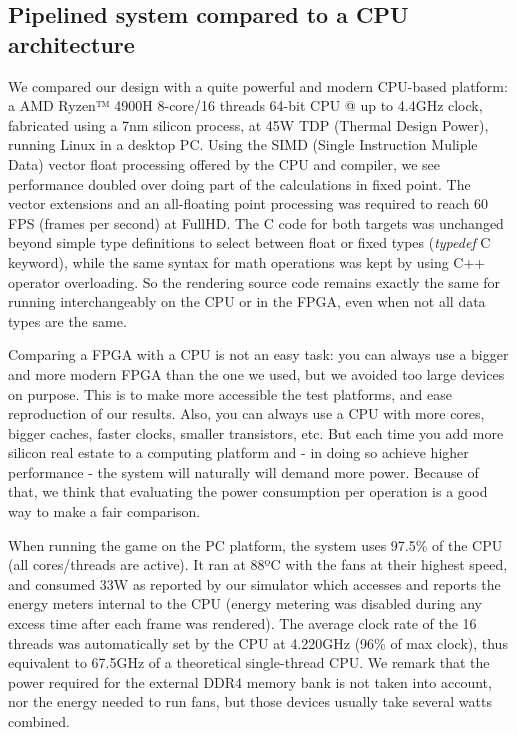 \documentclass[conference]{IEEEtran}
\begin{document}
\subsection{Pipelined system compared to a CPU architecture}

We compared our design with a quite powerful and modern CPU-based platform: a AMD Ryzen™ 4900H 8-core/16 threads 64-bit CPU @ up to 4.4GHz clock, fabricated using a 7nm silicon process, at 45W TDP (Thermal Design Power), running Linux in a desktop PC. Using the SIMD (Single Instruction Muliple Data) vector float processing offered by the CPU and compiler, we see performance doubled over doing part of the calculations in fixed point. The vector extensions and an all-floating point processing was required to reach 60 FPS (frames per second) at FullHD. The C code for both targets was unchanged beyond simple type definitions to select between float or fixed types (\textit{typedef} C keyword), while the same syntax for math operations was kept by using C++ operator overloading. So the rendering source code remains exactly the same for running interchangeably on the CPU or in the FPGA, even when not all data types are the same.

Comparing a FPGA with a CPU is not an easy task: you can always use a bigger and more modern FPGA than the one we used, but we avoided too large devices on purpose. This is to make more accessible the test platforms, and ease reproduction of our results. Also, you can always use a CPU with more cores, bigger caches, faster clocks, smaller transistors, etc. But each time you add more silicon real estate to a computing platform and - in doing so achieve higher performance - the system will naturally will demand more power. Because of that, we think that evaluating the power consumption per operation is a good way to make a fair comparison.

When running the game on the PC platform, the system uses 97.5\% of the CPU (all cores/threads are active). It ran at 88ºC with the fans at their highest speed, and consumed 33W as reported by our simulator which accesses and reports the energy meters internal to the CPU (energy metering was disabled during any excess time after each frame was rendered). The average clock rate of the 16 threads was automatically set by the CPU at 4.220GHz (96\% of max clock), thus equivalent to 67.5GHz of a theoretical single-thread CPU. We remark that the power required for the external DDR4 memory bank is not taken into account, nor the energy needed to run fans, but those devices usually take several watts combined.
\end{document}

